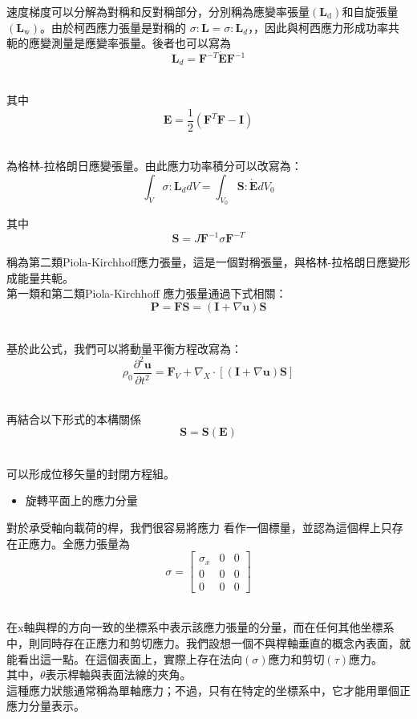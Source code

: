 速度梯度可以分解為對稱和反對稱部分，分別稱為應變率張量$\left(\mathbf{L}_{\mathrm{d}}\right)$和自旋張量$\left(\mathbf{L}_{\mathrm{w}}\right)$。由於柯西應力張量是對稱的 $\sigma: \mathbf{L}=\sigma: \mathbf{L}_d$，，因此與柯西應力形成功率共軛的應變測量是應變率張量。後者也可以寫為\
$$\mathbf{L}_d=\mathbf{F}^{-T} \dot{\mathbf{E}} \mathbf{F}^{-1}$$\

其中\
$$\mathbf{E}=\frac{1}{2}\left(\mathbf{F}^T \mathbf{F}-\mathbf{I}\right)$$\

為格林-拉格朗日應變張量。由此應力功率積分可以改寫為：\
$$\int_V \sigma: \mathbf{L}_d d V=\int_{V_0} \mathbf{S}: \dot{\mathbf{E}} d V_0$$

其中\
$$\mathbf{S}=J \mathbf{F}^{-1} \sigma \mathbf{F}^{-T}$$

稱為第二類Piola-Kirchhoff應力張量，這是一個對稱張量，與格林-拉格朗日應變形成能量共軛。\\

第一類和第二類Piola-Kirchhoff 應力張量通過下式相關：\
$$\mathbf{P}=\mathbf{F S}=(\mathbf{I}+\nabla \mathbf{u}) \mathbf{S}$$\

基於此公式，我們可以將動量平衡方程改寫為：\
$$\rho_0 \frac{\partial^2 \mathbf{u}}{\partial t^2}=\mathbf{F}_V+\nabla_X \cdot[(\mathbf{I}+\nabla \mathbf{u}) \mathbf{S}]$$\

再結合以下形式的本構關係\
$$\mathbf{S}=\mathbf{S}(\mathbf{E})$$\

可以形成位移矢量的封閉方程組。

\begin{itemize}
\item 旋轉平面上的應力分量
\end{itemize}

對於承受軸向載荷的桿，我們很容易將應力  看作一個標量，並認為這個桿上只存在正應力。全應力張量為\
$$\sigma=\left[\begin{array}{ccc}\sigma_x & 0 & 0 \\ 0 & 0 & 0 \\ 0 & 0 & 0\end{array}\right]$$\

在x軸與桿的方向一致的坐標系中表示該應力張量的分量，而在任何其他坐標系中，則同時存在正應力和剪切應力。我們設想一個不與桿軸垂直的概念內表面，就能看出這一點。在這個表面上，實際上存在法向$(\sigma)$應力和剪切$(\tau)$應力。\\

其中，$\theta$表示桿軸與表面法線的夾角。\\

這種應力狀態通常稱為單軸應力；不過，只有在特定的坐標系中，它才能用單個正應力分量表示。\\

